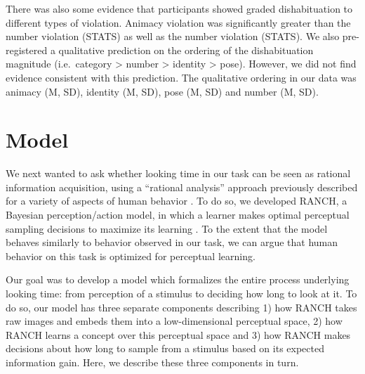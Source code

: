 \documentclass[10pt, letterpaper]{article}
\begin{document}
There was also some evidence that participants showed graded
dishabituation to different types of violation. Animacy violation was
significantly greater than the number violation (STATS) as well as the
number violation (STATS). We also pre-registered a qualitative
prediction on the ordering of the dishabituation magnitude
(i.e.~category \textgreater{} number \textgreater{} identity
\textgreater{} pose). However, we did not find evidence consistent with
this prediction. The qualitative ordering in our data was animacy (M,
SD), identity (M, SD), pose (M, SD) and number (M, SD).

\hypertarget{model}{%
\section{Model}\label{model}}

We next wanted to ask whether looking time in our task can be seen as
rational information acquisition, using a ``rational analysis'' approach
previously described for a variety of aspects of human behavior
\cite{chater, dubey}. To do so, we developed RANCH, a Bayesian
perception/action model, in which a learner makes optimal perceptual
sampling decisions to maximize its learning
\cite{cao2023habituation, raz2023modeling}. To the extent that the model
behaves similarly to behavior observed in our task, we can argue that
human behavior on this task is optimized for perceptual learning.

Our goal was to develop a model which formalizes the entire process
underlying looking time: from perception of a stimulus to deciding how
long to look at it. To do so, our model has three separate components
describing 1) how RANCH takes raw images and embeds them into a
low-dimensional perceptual space, 2) how RANCH learns a concept over
this perceptual space and 3) how RANCH makes decisions about how long to
sample from a stimulus based on its expected information gain. Here, we
describe these three components in turn.
\end{document}
